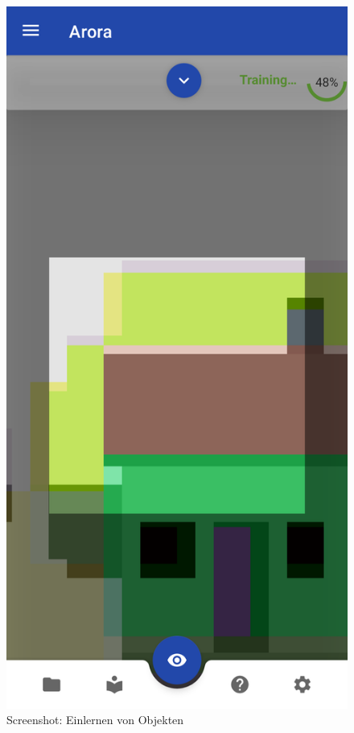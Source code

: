 \documentclass[oneside]{ausarbeitung}
\begin{document}
\begin{figure}[hptb]
	\centering
	\includegraphics[height=0.6\textheight]{images/screenshots/training.png}
	\caption{Screenshot: Einlernen von Objekten}
	\label{fig:screenshot:training}
\end{figure}
\end{document}
